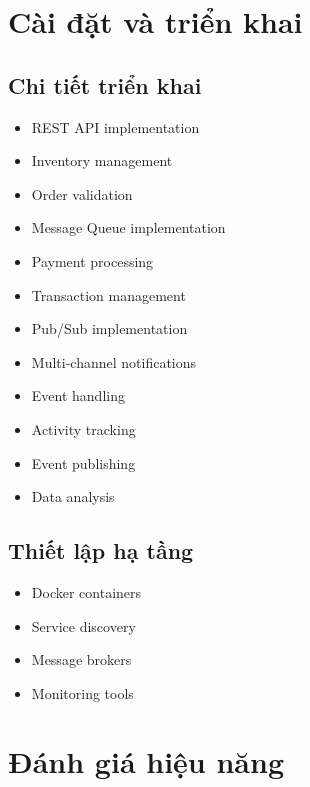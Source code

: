 \section{Cài đặt và triển khai}
\subsection{Chi tiết triển khai}
\begin{itemize}
    \item REST API implementation
    \item Inventory management
    \item Order validation
\end{itemize}

\begin{itemize}
    \item Message Queue implementation
    \item Payment processing
    \item Transaction management
\end{itemize}

\begin{itemize}
    \item Pub/Sub implementation
    \item Multi-channel notifications
    \item Event handling
\end{itemize}

\begin{itemize}
    \item Activity tracking
    \item Event publishing
    \item Data analysis
\end{itemize}

\subsection{Thiết lập hạ tầng}
\begin{itemize}
    \item Docker containers
    \item Service discovery
    \item Message brokers
    \item Monitoring tools
\end{itemize}

\section{Đánh giá hiệu năng}
